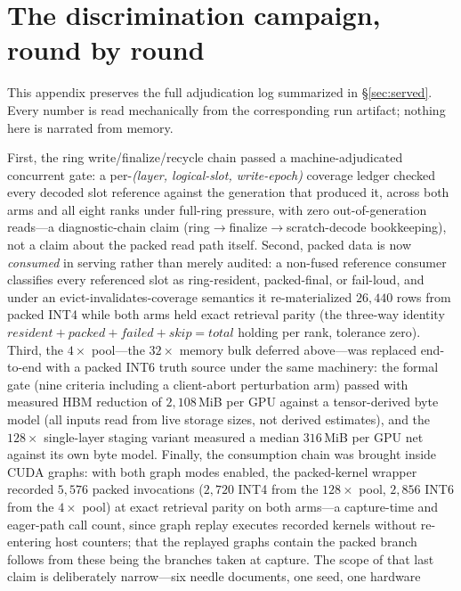 \documentclass[11pt]{article}
\begin{document}
\appendix
\setcounter{figure}{0}
\setcounter{table}{0}
\section{The discrimination campaign, round by round}
\label{app:campaign}
This appendix preserves the full adjudication log summarized in
\S\ref{sec:served}. Every number is read mechanically from the
corresponding run artifact; nothing here is narrated from memory.

First, the ring
write/finalize/recycle chain passed a machine-adjudicated concurrent gate: a
per-\emph{(layer, logical-slot, write-epoch)} coverage ledger checked every
decoded slot reference against the generation that produced it, across both
arms and all eight ranks under full-ring pressure, with zero
out-of-generation reads---a diagnostic-chain claim
(ring$\to$finalize$\to$scratch-decode bookkeeping), not a claim about
the packed read path itself. Second, packed data is now \emph{consumed} in
serving rather than merely audited: a non-fused reference consumer
classifies every referenced slot as ring-resident, packed-final, or
fail-loud, and under an evict-invalidates-coverage semantics it
re-materialized $26{,}440$ rows from packed INT4 while both arms held exact
retrieval parity (the three-way identity
$\mathit{resident}+\mathit{packed}+\mathit{failed}+\mathit{skip}=\mathit{total}$
holding per rank, tolerance zero). Third, the $4\times$ pool---the
$32\times$ memory bulk deferred above---was replaced end-to-end with a
packed INT6 truth source under the same machinery: the formal gate (nine
criteria including a client-abort perturbation arm) passed with measured
HBM reduction of $2{,}108$\,MiB per GPU against a tensor-derived byte model
(all inputs read from live storage sizes, not derived estimates), and the
$128\times$ single-layer staging variant measured a median $316$\,MiB per
GPU net against its own byte model. Finally, the consumption chain was
brought inside CUDA graphs: with both graph modes enabled, the
packed-kernel wrapper recorded $5{,}576$ packed invocations ($2{,}720$
INT4 from the $128\times$ pool, $2{,}856$ INT6 from the $4\times$
pool) at exact retrieval parity on both arms---a capture-time and
eager-path call count, since graph replay executes recorded kernels
without re-entering host counters; that the replayed graphs contain the
packed branch follows from these being the branches taken at capture. The scope of that last claim is
deliberately narrow---six needle documents, one seed, one hardware
\end{document}
